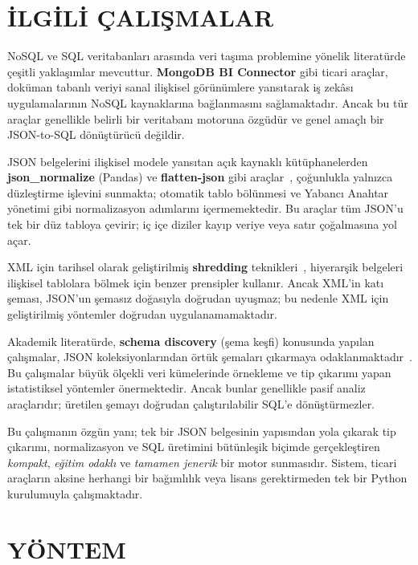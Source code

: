 \documentclass[conference,a4paper,10pt]{IEEEtran}
\begin{document}
\section{İLGİLİ ÇALIŞMALAR}

NoSQL ve SQL veritabanları arasında veri taşıma problemine yönelik literatürde çeşitli yaklaşımlar mevcuttur. \textbf{MongoDB BI Connector} gibi ticari araçlar, doküman tabanlı veriyi sanal ilişkisel görünümlere yansıtarak iş zekâsı uygulamalarının NoSQL kaynaklarına bağlanmasını sağlamaktadır. Ancak bu tür araçlar genellikle belirli bir veritabanı motoruna özgüdür ve genel amaçlı bir JSON-to-SQL dönüştürücü değildir.

JSON belgelerini ilişkisel modele yansıtan açık kaynaklı kütüphanelerden \textbf{json\_normalize} (Pandas) ve \textbf{flatten-json} gibi araçlar~\cite{pandas}, çoğunlukla yalnızca düzleştirme işlevini sunmakta; otomatik tablo bölünmesi ve Yabancı Anahtar yönetimi gibi normalizasyon adımlarını içermemektedir. Bu araçlar tüm JSON'u tek bir düz tabloya çevirir; iç içe diziler kayıp veriye veya satır çoğalmasına yol açar.

XML için tarihsel olarak geliştirilmiş \textbf{shredding} teknikleri~\cite{shredding}, hiyerarşik belgeleri ilişkisel tablolara bölmek için benzer prensipler kullanır. Ancak XML'in katı şeması, JSON'un şemasız doğasıyla doğrudan uyuşmaz; bu nedenle XML için geliştirilmiş yöntemler doğrudan uygulanamamaktadır.

Akademik literatürde, \textbf{schema discovery} (şema keşfi) konusunda yapılan çalışmalar, JSON koleksiyonlarından örtük şemaları çıkarmaya odaklanmaktadır~\cite{schemadisc}. Bu çalışmalar büyük ölçekli veri kümelerinde örnekleme ve tip çıkarımı yapan istatistiksel yöntemler önermektedir. Ancak bunlar genellikle pasif analiz araçlarıdır; üretilen şemayı doğrudan çalıştırılabilir SQL'e dönüştürmezler.

Bu çalışmanın özgün yanı; tek bir JSON belgesinin yapısından yola çıkarak tip çıkarımı, normalizasyon ve SQL üretimini bütünleşik biçimde gerçekleştiren \textit{kompakt}, \textit{eğitim odaklı} ve \textit{tamamen jenerik} bir motor sunmasıdır. Sistem, ticari araçların aksine herhangi bir bağımlılık veya lisans gerektirmeden tek bir Python kurulumuyla çalışmaktadır.

\section{YÖNTEM}
\end{document}
